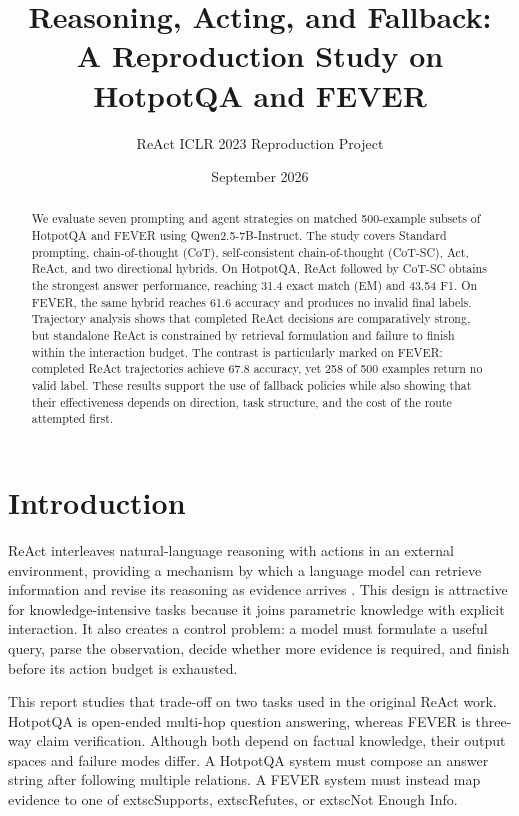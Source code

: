 \documentclass[10pt]{article}
\title{Reasoning, Acting, and Fallback:\\A Reproduction Study on HotpotQA and FEVER}
\author{ReAct ICLR 2023 Reproduction Project}
\date{September 2026}
\begin{document}
\maketitle

\begin{abstract}
We evaluate seven prompting and agent strategies on matched 500-example subsets of HotpotQA and FEVER using Qwen2.5-7B-Instruct. The study covers Standard prompting, chain-of-thought (CoT), self-consistent chain-of-thought (CoT-SC), Act, ReAct, and two directional hybrids. On HotpotQA, ReAct followed by CoT-SC obtains the strongest answer performance, reaching 31.4 exact match (EM) and 43.54 F1. On FEVER, the same hybrid reaches 61.6 accuracy and produces no invalid final labels. Trajectory analysis shows that completed ReAct decisions are comparatively strong, but standalone ReAct is constrained by retrieval formulation and failure to finish within the interaction budget. The contrast is particularly marked on FEVER: completed ReAct trajectories achieve 67.8 accuracy, yet 258 of 500 examples return no valid label. These results support the use of fallback policies while also showing that their effectiveness depends on direction, task structure, and the cost of the route attempted first.
\end{abstract}

\section{Introduction}

ReAct interleaves natural-language reasoning with actions in an external environment, providing a mechanism by which a language model can retrieve information and revise its reasoning as evidence arrives \cite{yao2023react}. This design is attractive for knowledge-intensive tasks because it joins parametric knowledge with explicit interaction. It also creates a control problem: a model must formulate a useful query, parse the observation, decide whether more evidence is required, and finish before its action budget is exhausted.

This report studies that trade-off on two tasks used in the original ReAct work. HotpotQA is open-ended multi-hop question answering, whereas FEVER is three-way claim verification. Although both depend on factual knowledge, their output spaces and failure modes differ. A HotpotQA system must compose an answer string after following multiple relations. A FEVER system must instead map evidence to one of 	extsc{Supports}, 	extsc{Refutes}, or 	extsc{Not Enough Info}.
\end{document}
